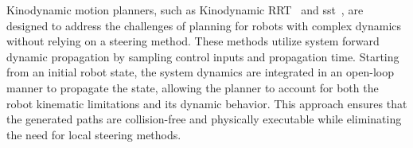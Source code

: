 Kinodynamic motion planners, such as Kinodynamic RRT~\cite{cKinoRRT} and \gls{sst}~\cite{cSST}, are designed to address the challenges of planning for robots with complex dynamics without relying on a steering method. 
These methods utilize system forward dynamic propagation by sampling control inputs and propagation time. 
Starting from an initial robot state, the system dynamics are integrated in an open-loop manner to propagate the state, allowing the planner to account for both the robot kinematic limitations and its dynamic behavior. 
This approach ensures that the generated paths are collision-free and physically executable while eliminating the need for local steering methods.






